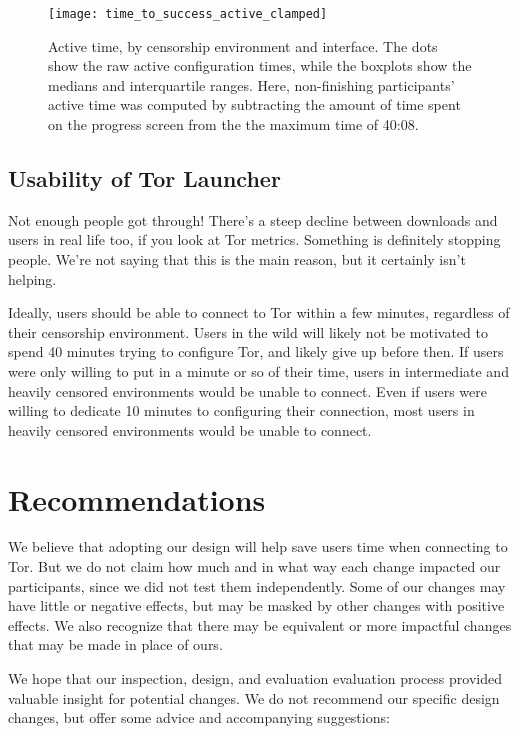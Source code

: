 \documentclass[USenglish,oneside,twocolumn]{article}
\begin{document}
\begin{figure}[t]
\centering
\texttt{[image: time\_to\_success\_active\_clamped]}
\caption{
Active time, by censorship environment and interface.
The dots show the raw active configuration times,
while the boxplots show the medians and interquartile ranges.
Here, non-finishing participants' active time was computed by
subtracting the amount of time spent on the progress screen from the 
the maximum time of 40:08.
}
\label{fig:time_to_success_active_clamped}
\end{figure}

\subsection{Usability of Tor Launcher} 
{\color {blue}
Not enough people got through! There's a steep decline between downloads and users in real life too, if you look at Tor metrics. Something is definitely stopping people. We're not saying that this is the main reason, but it certainly isn't helping. 

Ideally, users should be able to connect to Tor within a few minutes, regardless of their censorship environment.  Users in the wild will likely not be motivated to spend 40 minutes trying to configure Tor, and likely give up before then. If users were only willing to put in a minute or so of their time, users in intermediate and heavily censored environments would be unable to connect. Even if users were willing to dedicate 10 minutes to configuring their connection, most users in heavily censored environments would be unable to connect. 
}

\section{Recommendations}
\label{recommendations}
We believe that adopting our design will help save users time when connecting to Tor. But we do not claim how much and in what way each change impacted our participants, since we did not test them independently. Some of our changes may have little or negative effects, but may be masked by other changes with positive effects. We also recognize that there may be equivalent or more impactful changes that may be made in place of ours. 

We hope that our inspection, design, and evaluation evaluation process provided valuable insight for potential changes. We do not recommend our specific design changes, but offer some advice and accompanying suggestions: \\
\end{document}
